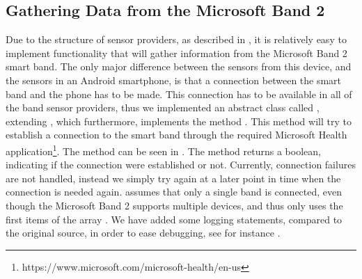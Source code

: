 \subsection{Gathering Data from the Microsoft Band 2}
Due to the structure of sensor providers, as described in , it is relatively easy to implement functionality that will gather information from the Microsoft Band 2 smart band. The only major difference between the sensors from this device, and the sensors in an Android smartphone, is that a connection between the smart band and the phone has to be made. This connection has to be available in all of the band sensor providers, thus we implemented an abstract class called , extending , which furthermore, implements the method . This method will try to establish a connection to the smart band through the required Microsoft Health application\footnote{https://www.microsoft.com/microsoft-health/en-us}. The method can be seen in . The method returns a boolean, indicating if the connection were established or not. Currently, connection failures are not handled, instead we simply try again at a later point in time when the connection is needed again.  assumes that only a single band is connected, even though the Microsoft Band 2 supports multiple devices, and thus only uses the first items of the  array . We have added some logging statements, compared to the original source, in order to ease debugging, see for instance . 


\FloatBarrier


